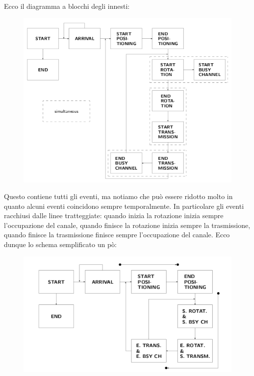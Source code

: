 \documentclass[11pt]{book}
\begin{document}
Ecco il diagramma a blocchi degli innesti:

\begin{figure}[H]
  \centering
  \includegraphics[width=\textwidth]{images/cap11fig25.png}
\end{figure}

Questo contiene tutti gli eventi, ma notiamo che pu\`o essere ridotto
molto in quanto alcuni eventi coincidono sempre temporalmente. In
particolare gli eventi racchiusi dalle linee tratteggiate: quando
inizia la rotazione inizia sempre l'occupazione del canale, quando
finisce la rotazione inizia sempre la trasmissione, quando finisce la
trasmissione finisce sempre l'occupazione del canale. Ecco dunque lo
schema semplificato un p\`o:

\begin{figure}[H]
  \centering
  \includegraphics[width=\textwidth]{images/cap11fig26.png}
\end{figure}
\end{document}
